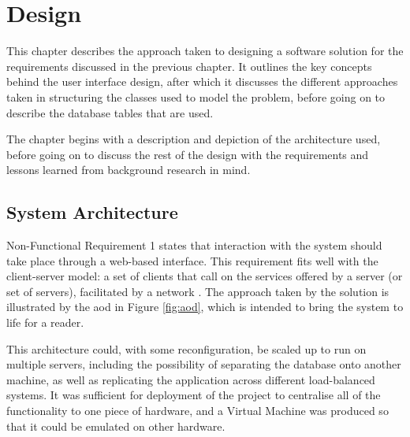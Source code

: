 \chapter{Design}
\label{design}

This chapter describes the approach taken to designing a software solution for the requirements discussed in the previous chapter.  It outlines the key concepts behind the user interface design, after which it discusses the different approaches taken in structuring the classes used to model the problem, before going on to describe the database tables that are used.

The chapter begins with a description and depiction of the architecture used, before going on to discuss the rest of the design with the requirements and lessons learned from background research in mind. 

\section{System Architecture}
Non-Functional Requirement 1 states that interaction with the system should take place through a web-based interface.  This requirement fits well with the client-server model: a set of clients that call on the services offered by a server (or set of servers), facilitated by a network \cite{sommerville}.  The approach taken by the solution is illustrated by the \gls{aod} in Figure \ref{fig:aod}, which is intended to bring the system to life for a reader.

This architecture could, with some reconfiguration, be scaled up to run on multiple servers, including the possibility of separating the database onto another machine, as well as replicating the application across different load-balanced systems.  It was sufficient for deployment of the project to centralise all of the functionality to one piece of hardware, and a Virtual Machine was produced so that it could be emulated on other hardware.


